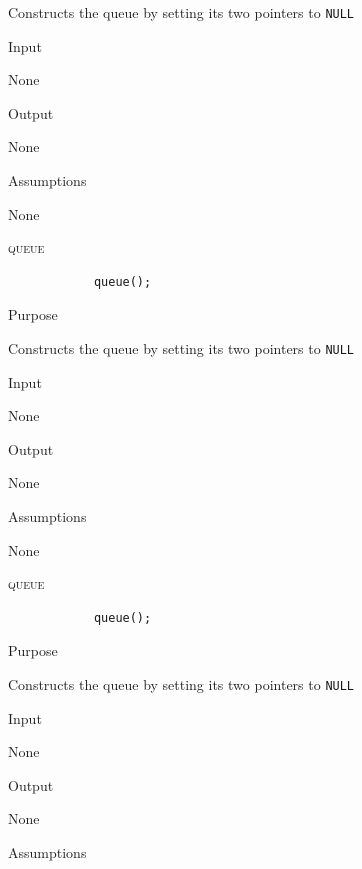 \documentclass[pdftex, 11pt]{article}
\begin{document}
\begin{description}
\begin{description}
				Constructs the queue by setting its two pointers
				to \texttt{NULL}

			\item{Input}

				None

			\item{Output}
				
				None

			\item{Assumptions}

				None

		\end{description}
	\item{\textsc{queue}}

		\begin{lstlisting}
			queue();
		\end{lstlisting}

		\begin{description}
			\item{Purpose}
				
				Constructs the queue by setting its two pointers
				to \texttt{NULL}

			\item{Input}

				None

			\item{Output}
				
				None

			\item{Assumptions}

				None

		\end{description}
	\item{\textsc{queue}}

		\begin{lstlisting}
			queue();
		\end{lstlisting}

		\begin{description}
			\item{Purpose}
				
				Constructs the queue by setting its two pointers
				to \texttt{NULL}

			\item{Input}

				None

			\item{Output}
				
				None

			\item{Assumptions}


\end{description}
\end{description}
\end{document}
